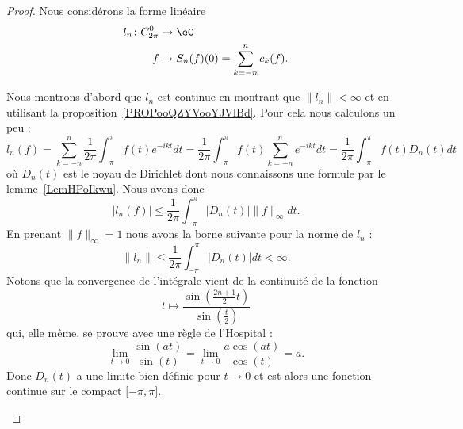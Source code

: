 \begin{proof}
	Nous considérons la forme linéaire
	\begin{equation}
		\begin{aligned}
			l_n\colon C^0_{2\pi} & \to \eC                                \\
			f                    & \mapsto S_n(f)(0)=\sum_{k=-n}^nc_k(f).
		\end{aligned}
	\end{equation}
	\begin{subproof}
		Nous montrons d'abord que \(  l_n \) est continue en montrant que \( \| l_n \|<\infty\) et en utilisant la proposition~\ref{PROPooQZYVooYJVlBd}. Pour cela nous calculons un peu :
		\begin{equation}    \label{EqBELHGya}
			l_n(f)=\sum_{k=-n}^n\frac{1}{ 2\pi }\int_{-\pi}^{\pi}f(t) e^{-ikt}dt=\frac{1}{ 2\pi }\int_{-\pi}^{\pi}f(t)\sum_{k=-n}^n e^{-ikt}dt=\frac{1}{ 2\pi }\int_{-\pi}^{\pi}f(t)D_n(t)dt
		\end{equation}
		où \( D_n(t)\) est le noyau de Dirichlet dont nous connaissons une formule par le lemme~\ref{LemHPoIkwu}. Nous avons donc
		\begin{equation}
			| l_n(f) |\leq \frac{1}{ 2\pi }\int_{-\pi}^{\pi}| D_n(t) |\| f \|_{\infty}dt.
		\end{equation}
		En prenant \( \| f \|_{\infty}=1\) nous avons la borne suivante pour la norme de \( l_n\) :
		\begin{equation}        \label{EqBXoIUiD}
			\| l_n \|\leq \frac{1}{ 2\pi }\int_{-\pi}^{\pi}| D_n(t) |dt<\infty.
		\end{equation}
		Notons que la convergence de l'intégrale vient de la continuité de la fonction
		\begin{equation}
			t\mapsto \frac{ \sin\left( \frac{ 2n+1 }{2}t \right) }{ \sin\left( \frac{ t }{ 2 } \right) }
		\end{equation}
		qui, elle même, se prouve avec une règle de l'Hospital :
		\begin{equation}
			\lim_{t\to 0} \frac{ \sin(at) }{ \sin(t) }=\lim_{t\to 0} \frac{ a\cos(at) }{ \cos(t) }=a.
		\end{equation}
		Donc \( D_n(t)\) a une limite bien définie pour \( t\to 0\) et est alors une fonction continue sur le compact \( \mathopen[ -\pi , \pi \mathclose]\).



\end{subproof}
\end{proof}
